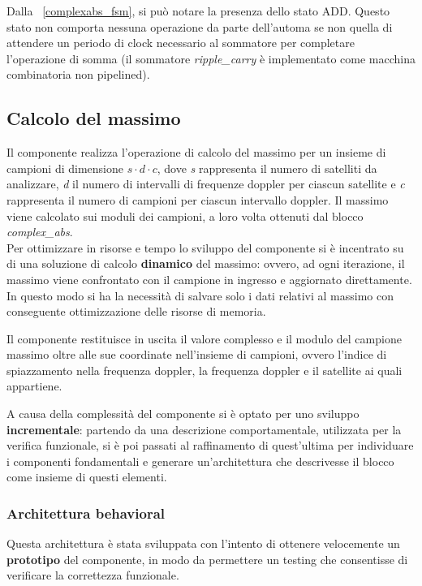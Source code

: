 \documentclass[12pt,a4paper,twoside,openany]{book}
\begin{document}
Dalla \figurename~\ref{complexabs_fsm}, si può notare la presenza dello stato ADD. Questo stato non comporta nessuna operazione da parte dell'automa se non quella di attendere un periodo di clock necessario al sommatore per completare l'operazione di somma (il sommatore \textit{ripple\_carry} è implementato come macchina combinatoria non pipelined).
\clearpage
\subsection{Calcolo del massimo}
Il componente realizza l'operazione di calcolo del massimo per un insieme di campioni di dimensione $s \cdot d \cdot c$, dove \textit{s} rappresenta il numero di satelliti da analizzare, \textit{d} il numero di intervalli di frequenze doppler per ciascun satellite e \textit{c} rappresenta il numero di campioni per ciascun intervallo doppler. Il massimo viene calcolato sui moduli dei campioni, a loro volta ottenuti dal blocco \textit{complex\_abs}.\\
Per ottimizzare in risorse e tempo lo sviluppo del componente si è incentrato su di una soluzione di calcolo \textbf{dinamico} del massimo: ovvero, ad ogni iterazione, il massimo viene confrontato con il campione in ingresso e aggiornato direttamente. In questo modo si ha la necessità di salvare solo i dati relativi al massimo con conseguente ottimizzazione delle risorse di memoria.

Il componente restituisce in uscita il valore complesso e il modulo del campione massimo oltre alle sue coordinate nell'insieme di campioni, ovvero l'indice di spiazzamento nella frequenza doppler, la frequenza doppler e il satellite ai quali appartiene.

A causa della complessità del componente si è optato per uno sviluppo \textbf{incrementale}: partendo da una descrizione comportamentale, utilizzata per la verifica funzionale, si è poi passati al raffinamento di quest'ultima per individuare i componenti fondamentali e generare un'architettura che descrivesse il blocco come insieme di questi elementi. 

\subsubsection{Architettura behavioral}
Questa architettura è stata sviluppata con l'intento di ottenere velocemente un \textbf{prototipo} del componente, in modo da permettere un testing che consentisse di verificare la correttezza funzionale.
\end{document}
